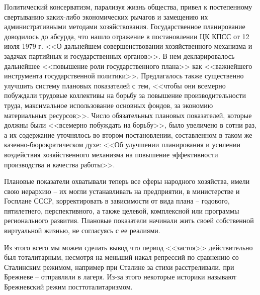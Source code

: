 \documentclass[12pt]{article}
\begin{document}
\begin{enumerate}[label=\textbf{\large\arabic*}]
    Политический консерватизм, парализуя жизнь общества,
    привел к постепенному свертыванию каких-либо экономических рычагов и замещению их административными методами хозяйствования.
    Государственное планирование доводилось до абсурда, что нашло отражение в постановлении ЦК КПСС от 12 июля 1979 г.
    <<О дальнейшем совершенствовании хозяйственного механизма и задачах партийных и государственных органов>>.
    В нем декларировалось дальнейшее <<повышение роли государственного плана>> как <<важнейшего инструмента государственной политики>>.
    Предлагалось также существенно улучшить систему плановых показателей с тем,
    <<чтобы они всемерно побуждали трудовые коллективы на борьбу за повышение производительности труда,
    максимальное использование основных фондов, за экономию материальных ресурсов>>.
    Число обязательных плановых показателей, которые должны были <<всемерно побуждать на борьбу>>, было увеличено в сотни раз,
    а их содержание уточнялось во втором постановлении, составленном в таком же казенно-бюрократическом духе:
    <<Об улучшении планирования и усилении воздействия хозяйственного механизма на повышение эффективности производства и качества работы>>.

    Плановые показатели охватывали теперь все сферы народного хозяйства, имели свою иерархию -- их могли устанавливать на предприятии,
    в министерстве и Госплане СССР, корректировать в зависимости от вида плана -- годового, пятилетнего, перспективного,
    а также целевой, комплексной или программы регионального развития.
    Плановые показатели начинали жить своей собственной виртуальной жизнью, не согласуясь с ее реалиями.
  \end{enumerate}

  Из этого всего мы можем сделать вывод что период <<застоя>> действительно был тоталитарным,
  несмотря на меньший накал репрессий по сравнению со Сталинским режимом,
  например при Сталине за стихи расстреливали, при Брежневе -- отправляли в лагеря.
  Из-за этого некоторые историки называют Брежневский режим посттоталитаризмом.

\end{document}
